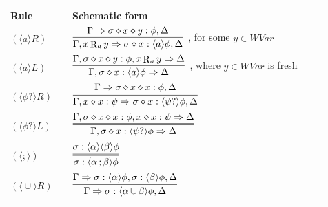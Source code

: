 \documentclass[manuscript,screen]{acmart}
\newcommand{\la}[0]{\langle}
\newcommand{\ra}[0]{\rangle}
\DeclareMathOperator{\seq}{;}
\DeclareMathOperator{\cho}{\cup}
\newcommand{\cat}[0]{\diamond}
\newcommand{\WVar}[0]{\textit{WVar}}
\DeclareMathOperator{\R}{R}
\begin{document}
\begin{table}[t]
\centering
\small
\begin{tabular}{p{0.18\linewidth}p{0.74\linewidth}}
\toprule
Rule & Schematic form \\
\midrule
$(\la a\ra R)$ & $\begin{aligned}\infer[]{\Gamma, x \R_a y\Rightarrow \sigma\cat x:\la a\ra\phi,\Delta}{\Gamma\Rightarrow \sigma\cat x\cat y:\phi,\Delta}\end{aligned}$, for some $y\in\WVar$\\[1.2em]
$(\la a\ra L)$ & $\begin{aligned}\infer[]{\Gamma,\sigma\cat x:\la a\ra\phi\Rightarrow\Delta}{\Gamma,\sigma\cat x\cat y:\phi, x\R_a y\Rightarrow\Delta}\end{aligned}$, where $y\in\WVar$ is fresh\\[1.2em]
$(\la\phi?\ra R)$ & $\begin{aligned}\infer=[]{\Gamma, x\cat x : \psi\Rightarrow\sigma\cat x:\la\psi?\ra\phi,\Delta}{\Gamma\Rightarrow\sigma\cat x\cat x:\phi,\Delta}\end{aligned}$\\[1.2em]
$(\la\phi?\ra L)$ & $\begin{aligned}\infer=[]{\Gamma,\sigma\cat x:\la\psi?\ra\phi\Rightarrow\Delta}{\Gamma,\sigma\cat x\cat x:\phi, x\cat x : \psi\Rightarrow\Delta}\end{aligned}$\\[1.2em]
$(\la\seq\ra)$ & $\begin{aligned}\infer=[]{\sigma:\la\alpha\seq\beta\ra\phi}{\sigma:\la\alpha\ra\la\beta\ra\phi}\end{aligned}$\\[1.2em]
$(\la\cho\ra R)$ & $\begin{aligned}\infer[]{\Gamma\Rightarrow \sigma:\la\alpha\cho\beta\ra\phi, \Delta}{\Gamma\Rightarrow \sigma:\la\alpha\ra\phi, \sigma:\la\beta\ra\phi, \Delta}\end{aligned}$\\[1.2em]

\end{tabular}
\end{table}
\end{document}
